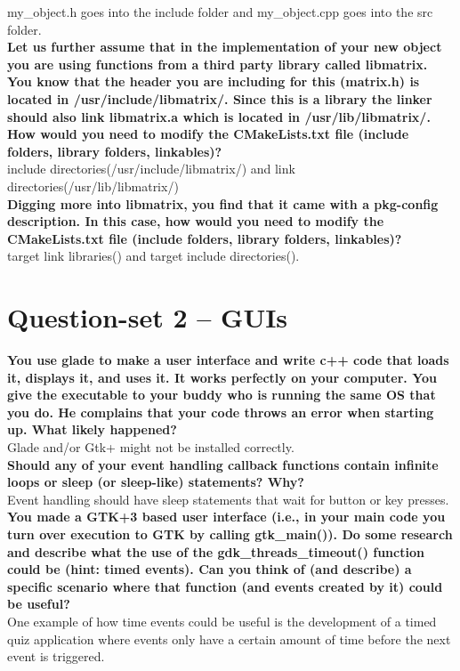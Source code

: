 \documentclass{article}
\begin{document}
my\_object.h goes into the include folder and my\_object.cpp goes into the src folder. \\


\textbf{Let us further assume that in the implementation of your new object you are using functions from a third party library called libmatrix. You know that the header you are including for this (matrix.h) is located in /usr/include/libmatrix/. Since this is a library the linker should also link libmatrix.a which is located in /usr/lib/libmatrix/. How would you need to modify the CMakeLists.txt file (include folders, library folders, linkables)?}\\

include directories(/usr/include/libmatrix/) and link directories(/usr/lib/libmatrix/)\\

\textbf{Digging more into libmatrix, you find that it came with a pkg-config description. In this case, how would you need to modify the CMakeLists.txt file (include folders, library folders, linkables)?}\\

target link libraries() and target include directories(). \\

\section{Question-set 2 -- GUIs}
\textbf{You use glade to make a user interface and write c++ code that loads it, displays it, and uses it. It works perfectly on your computer. You give the executable to your buddy who is running the same OS that you do. He complains that your code throws an error when starting up. What likely happened? }\\

Glade and/or Gtk+ might not be installed correctly. \\


\textbf{Should any of your event handling callback functions contain infinite loops or sleep (or sleep-like) statements? Why? }\\

Event handling should have sleep statements that wait for button or key presses. \\

\textbf{You made a GTK+3 based user interface (i.e., in your main code you turn over execution to GTK by calling gtk\_main()). Do some research and describe what the use of the gdk\_threads\_timeout() function could be (hint: timed events). Can you think of (and describe) a specific scenario where that function (and events created by it) could be useful?}\\

One example of how time events could be useful is the development of a timed quiz application where events only have a certain amount of time before the next event is triggered. \\
\end{document}
